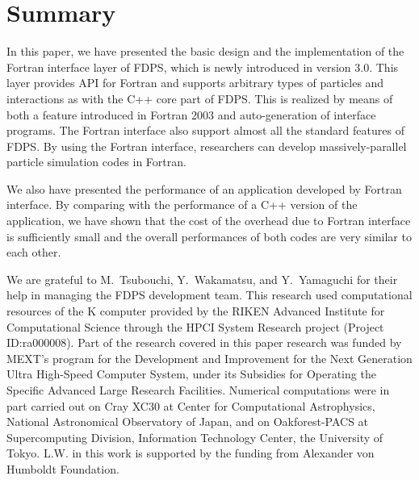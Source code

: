 \documentclass[proof,useamsfonts]{pasj01}
\begin{document}
\section{Summary}
\label{sec:summary}
In this paper, we have presented the basic design and the implementation of the  Fortran interface layer of FDPS, which is newly introduced in version 3.0. This layer provides API for Fortran and supports arbitrary types of particles and interactions as with the C++ core part of FDPS. This is realized by means of both a feature introduced in Fortran 2003 and auto-generation of interface programs. The Fortran interface also support almost all the standard features of FDPS. By using the Fortran interface, researchers can develop massively-parallel particle simulation codes in Fortran.

We also have presented the performance of an application developed by Fortran interface. By comparing with the performance of a C++ version of the application, we have shown that the cost of the overhead due to Fortran interface is sufficiently small and the overall performances of both codes are very similar to each other.  


\bigskip
We are grateful to M.~Tsubouchi, Y.~Wakamatsu, and Y.~Yamaguchi for their help in managing the FDPS development team. This research used computational resources of the K computer provided by the RIKEN Advanced Institute for Computational Science through the HPCI System Research project (Project ID:ra000008). Part of the research covered in this paper research was funded by MEXT’s program for the Development and Improvement for the Next Generation Ultra High-Speed Computer System, under its Subsidies for Operating the Specific Advanced Large Research Facilities. Numerical computations were in part carried out on Cray XC30 at Center for Computational Astrophysics, National Astronomical Observatory of Japan, and on Oakforest-PACS at Supercomputing Division, Information Technology Center, the University of Tokyo. L.W. in this work is supported by the funding from Alexander von Humboldt Foundation.
\end{document}
